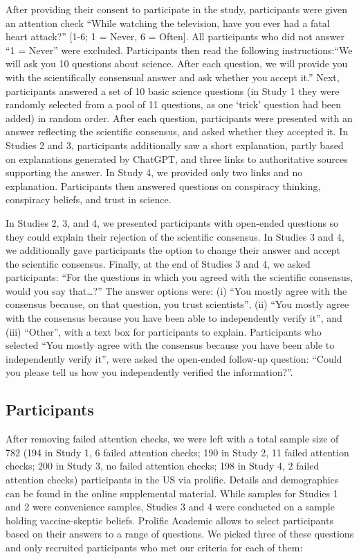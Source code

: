 \documentclass[
  doc,floatsintext]{apa6}
\begin{document}
After providing their consent to participate in the study, participants were given an attention check ``While watching the television, have you ever had a fatal heart attack?'' {[}1-6; 1 = Never, 6 = Often{]}. All participants who did not answer ``1 = Never'' were excluded. Participants then read the following instructions:``We will ask you 10 questions about science. After each question, we will provide you with the scientifically consensual answer and ask whether you accept it.'' Next, participants answered a set of 10 basic science questions (in Study 1 they were randomly selected from a pool of 11 questions, as one `trick' question had been added) in random order. After each question, participants were presented with an answer reflecting the scientific consensus, and asked whether they accepted it. In Studies 2 and 3, participants additionally saw a short explanation, partly based on explanations generated by ChatGPT, and three links to authoritative sources supporting the answer. In Study 4, we provided only two links and no explanation. Participants then answered questions on conspiracy thinking, conspiracy beliefs, and trust in science.

In Studies 2, 3, and 4, we presented participants with open-ended questions so they could explain their rejection of the scientific consensus. In Studies 3 and 4, we additionally gave participants the option to change their answer and accept the scientific consensus. Finally, at the end of Studies 3 and 4, we asked participants: ``For the questions in which you agreed with the scientific consensus, would you say that\ldots?'' The answer options were: (i) ``You mostly agree with the consensus because, on that question, you trust scientists'', (ii) ``You mostly agree with the consensus because you have been able to independently verify it'', and (iii) ``Other'', with a text box for participants to explain. Participants who selected ``You mostly agree with the consensus because you have been able to independently verify it'', were asked the open-ended follow-up question: ``Could you please tell us how you independently verified the information?''.

\subsection{Participants}\label{participants}

After removing failed attention checks, we were left with a total sample size of 782 (194 in Study 1, 6 failed attention checks; 190 in Study 2, 11 failed attention checks; 200 in Study 3, no failed attention checks; 198 in Study 4, 2 failed attention checks) participants in the US via prolific. Details and demographics can be found in the online supplemental material. While samples for Studies 1 and 2 were convenience samples, Studies 3 and 4 were conducted on a sample holding vaccine-skeptic beliefs. Prolific Academic allows to select participants based on their answers to a range of questions. We picked three of these questions and only recruited participants who met our criteria for each of them:
\end{document}
